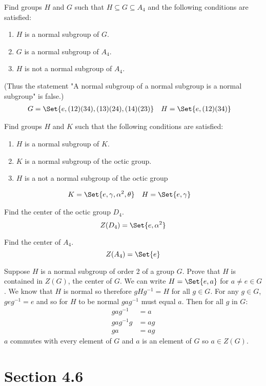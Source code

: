 \documentclass[paper=a4, fontsize=11pt]{jhwhw} %
\begin{document}
Find groups $H$ and $G$ such that $H\subseteq G\subseteq A_4$ and the following conditions are satisfied:
\begin{enumerate}
    \item $H$ is a normal subgroup of $G$.
    \item $G$ is a normal subgroup of $A_4$.
    \item $H$ is not a normal subgroup of $A_4$.
\end{enumerate}
(Thus the statement "A normal subgroup of a normal subgroup is a normal subgroup" is false.)
\solution
\begin{align}
    G &= \Set{e, (1 2)(3 4), (1 3)(2 4), (1 4)(2 3)} &&H=\Set{e, (1 2)(3 4)}
\end{align}

Find groups $H$ and $K$ such that the following conditions are satisfied:
\begin{enumerate}
    \item $H$ is a normal subgroup of $K$.
    \item $K$ is a normal subgroup of the octic group.
    \item $H$ is a not a normal subgroup of the octic group
\end{enumerate}
\solution
\begin{align}
    &K = \Set{e, \gamma, \alpha^2, \theta} &&H = \Set{e, \gamma}
\end{align}

Find the center of the octic group $D_4$.
\solution
$$Z(D_4) = \Set{e, \alpha^2}$$

Find the center of $A_4$.
\solution
$$Z(A_4) = \Set{e}$$

Suppose $H$ is a normal subgroup of order 2 of a group $G$. Prove that $H$ is contained in $Z(G)$, the center of $G$.
\solution
We can write $H = \Set{e, a}$ for $a\not= e\in G$. We know that $H$ is normal so therefore $gHg^{-1} = H$ for all $g\in G$. For any $g\in G$, $geg^{-1} = e$ and so for $H$ to be normal $gag^{-1}$ must equal $a$. Then for all $g$ in $G$:
\begin{align}
    gag^{-1} &= a\\
    gag^{-1}g &= ag\\
    ga &= ag
\end{align}
$a$ commutes with every element of $G$ and $a$ is an element of $G$ so $a\in Z(G)$.


\newpage
\section*{Section 4.6}
\end{document}
